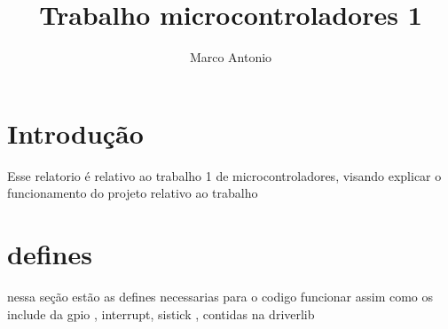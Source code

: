 \documentclass{article}
\date{} %
\title{Trabalho microcontroladores 1}
\author{Marco Antonio}
\begin{document}
\maketitle

\section{Introdução}

Esse relatorio é relativo ao trabalho 1 de microcontroladores, visando explicar
o funcionamento do projeto relativo ao trabalho

\section{defines}
nessa seção estão as defines necessarias para o codigo funcionar assim
como os include da gpio , interrupt, sistick , contidas na driverlib
\end{document}
